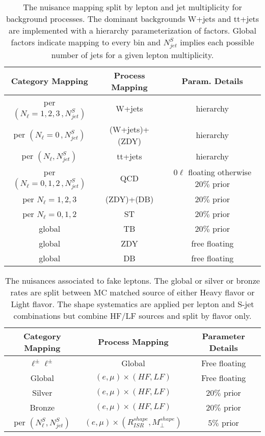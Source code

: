 \begin{table}
\centering
\caption{The nuisance mapping split by lepton and jet multiplicity for background processes. The dominant backgrounds W+jets and tt+jets are implemented with a hierarchy parameterization of factors.  Global factors indicate mapping to every bin and $N_{jet}^S$ implies each possible number of jets for a given lepton multiplicity.}
 
\begin{tabular}{ccc}
\hline 
Category Mapping & Process Mapping & Param. Details \\ 
\hline 
\hline
per  $(N_\ell =1,2,3  \, ,N_{jet}^S)$ & W+jets & hierarchy \\ 

per $(N_\ell = 0 \, , N_{jet}^S)$ & (W+jets)+(ZDY) & hierarchy \\ 

per $(N_\ell, N_{jet}^S)$ & tt+jets & hierarchy \\ 
 
per $(N_\ell=0,1,2 \,, N_{jet}^S)$ & QCD & $0\ell$ floating otherwise $20\%$ prior \\ 
per $N_\ell=1,2,3$ & (ZDY)+(DB) & $20\%$ prior \\ 
per $N_\ell=0,1,2$ & ST & $20\%$ prior \\ 
global & TB & $20\%$ prior \\ 
global & ZDY & free floating \\ 
global & DB & free floating \\ 
\hline 
\end{tabular} 
\label{tab:procnuisance}

\end{table}

\begin{table}
\centering
\caption{The nuisances associated to fake leptons. The global or silver or bronze rates are split between MC matched source of either Heavy flavor or Light flavor. The shape systematics are applied per lepton and S-jet combinations but combine HF/LF sources and split by flavor only.}
\begin{tabular}{ccc}

Category Mapping & Process Mapping & Parameter Details \\ 
\hline 
\hline
$\ell^\pm\ell^\pm$ & Global & Free floating \\ 
 
Global & $(e,\mu)\times(HF,LF)$ & Free floating \\ 
 
Silver & $(e,\mu)\times(HF,LF)$ & $20\%$ prior \\ 
 
Bronze & $(e,\mu)\times(HF,LF)$ & $20\%$ prior \\ 
 
per $(N_\ell^S,N_{jet}^S)$ & $(e,\mu)\times(R_{ISR}^{shape}, M_\perp^{shape})$ & $5\%$ prior \\ 
\hline 
\end{tabular} 
\label{tab:fakenuisance}

\end{table}


